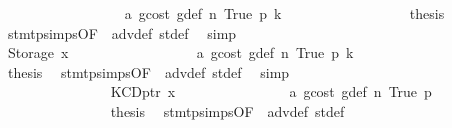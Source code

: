 \begin{isabellebody}
\ \ \ \ \ \ \ \ \ \ \ \ \ \ \ \ \isamarkupfalse%
\ a{}\ gcost\ g{\isacharunderscore}{\kern0pt}def\ n{}\ True\ p{}\ k{}\isanewline
\ \ \ \ \ \ \ \ \ \ \ \ \ \ \ \ \isamarkupfalse%
\ {\isacharquery}{\kern0pt}thesis\ \isamarkupfalse%
\ stmt{\isachardot}{\kern0pt}psimps{\isacharparenleft}{\kern0pt}{}{}{\isacharparenright}{\kern0pt}{\isacharbrackleft}{\kern0pt}OF\ {}{}{\isacharparenleft}{\kern0pt}{}{\isacharparenright}{\kern0pt}{\isacharbrackright}{\kern0pt}\ adv{\isacharunderscore}{\kern0pt}def\ st{\isacharprime}{\kern0pt}{\isacharunderscore}{\kern0pt}def\ \isamarkupfalse%
\ simp\isanewline
\ \ \ \ \ \ \ \ \ \ \ \ \ \ \isamarkupfalse%
\isanewline
\ \ \ \ \ \ \ \ \ \ \ \ \ \ \ \ \isamarkupfalse%
\ {\isacharparenleft}{\kern0pt}Storage\ x{}{\isacharparenright}{\kern0pt}\isanewline
\ \ \ \ \ \ \ \ \ \ \ \ \ \ \ \ \isamarkupfalse%
\ a{}\ gcost\ g{\isacharunderscore}{\kern0pt}def\ n{}\ True\ p{}\ k{}\isanewline
\ \ \ \ \ \ \ \ \ \ \ \ \ \ \ \ \isamarkupfalse%
\ {\isacharquery}{\kern0pt}thesis\ \isamarkupfalse%
\ stmt{\isachardot}{\kern0pt}psimps{\isacharparenleft}{\kern0pt}{}{}{\isacharparenright}{\kern0pt}{\isacharbrackleft}{\kern0pt}OF\ {}{}{\isacharparenleft}{\kern0pt}{}{\isacharparenright}{\kern0pt}{\isacharbrackright}{\kern0pt}\ adv{\isacharunderscore}{\kern0pt}def\ st{\isacharprime}{\kern0pt}{\isacharunderscore}{\kern0pt}def\ \isamarkupfalse%
\ simp\isanewline
\ \ \ \ \ \ \ \ \ \ \ \ \ \ \isamarkupfalse%
\isanewline
\ \ \ \ \ \ \ \ \ \ \ \ \isamarkupfalse%
\isanewline
\ \ \ \ \ \ \ \ \ \ \ \ \ \ \isamarkupfalse%
\ {\isacharparenleft}{\kern0pt}KCDptr\ x{}{\isacharparenright}{\kern0pt}\isanewline
\ \ \ \ \ \ \ \ \ \ \ \ \ \ \isamarkupfalse%
\ a{}\ gcost\ g{\isacharunderscore}{\kern0pt}def\ n{}\ True\ p{}\isanewline
\ \ \ \ \ \ \ \ \ \ \ \ \ \ \isamarkupfalse%
\ {\isacharquery}{\kern0pt}thesis\ \isamarkupfalse%
\ stmt{\isachardot}{\kern0pt}psimps{\isacharparenleft}{\kern0pt}{}{}{\isacharparenright}{\kern0pt}{\isacharbrackleft}{\kern0pt}OF\ {}{}{\isacharparenleft}{\kern0pt}{}{\isacharparenright}{\kern0pt}{\isacharbrackright}{\kern0pt}\ adv{\isacharunderscore}{\kern0pt}def\ st{\isacharprime}{\kern0pt}{\isacharunderscore}{\kern0pt}def\ \isamarkupfalse%

\end{isabellebody}
